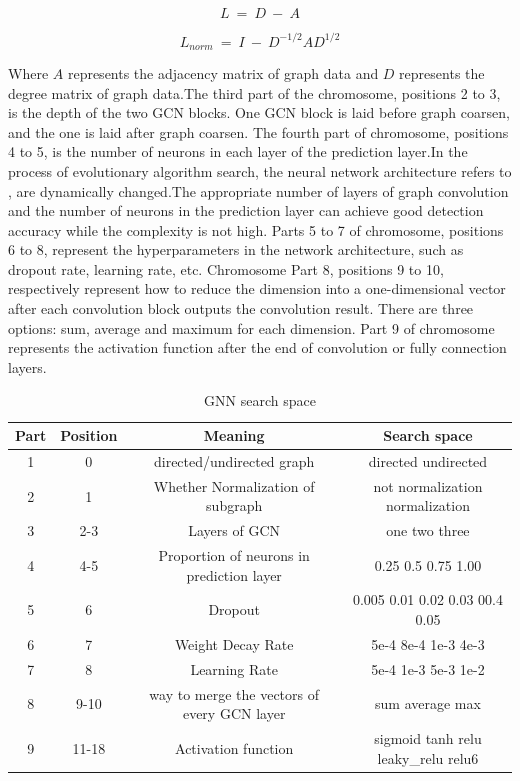 \documentclass[lettersize,journal]{IEEEtran}
\begin{document}
\begin{equation}
\label{deqn_ex_7}
L\ =\ D\ -\ A
\end{equation}

\begin{equation}
\label{deqn_ex_8}
L_{norm}\ =\ I\ -\ D^{-1/2}AD^{1/2}
\end{equation}

Where $A$ represents the adjacency matrix of graph data and $D$ represents the degree matrix of graph data.The third part of the chromosome, positions 2 to 3, is the depth of the two GCN blocks. One GCN block is laid before graph coarsen, and the one is laid after graph coarsen. The fourth part of chromosome, positions 4 to 5, is the number of neurons in each layer of the prediction layer.In the process of evolutionary algorithm search, the neural network architecture refers to \cite{62,67}, are dynamically changed.The appropriate number of layers of graph convolution and the number of neurons in the prediction layer can achieve good detection accuracy while the complexity is not high. Parts 5 to 7 of chromosome, positions 6 to 8, represent the hyperparameters in the network architecture, such as dropout rate, learning rate, etc. Chromosome Part 8, positions 9 to 10, respectively represent how to reduce the dimension into a one-dimensional vector after each convolution block outputs the convolution result. There are three options: sum, average and maximum for each dimension. Part 9 of chromosome represents the activation function after the end of convolution or fully connection layers. 

\begin{table}[!t]
\caption{GNN search space\label{table1}}
\centering
\begin{tabular}{cccc}
\hline
Part & Position & Meaning	 & Search space\\
\hline
1 & 0 & directed/undirected graph & directed undirected\\
2 & 1 & Whether Normalization of subgraph & not normalization normalization\\
3 & 2-3 & Layers of GCN & one two three\\
4 & 4-5 & Proportion of neurons in prediction layer & 0.25 0.5 0.75 1.00\\
5 & 6	 & Dropout & 0.005 0.01 0.02 0.03 00.4 0.05\\
6 & 7 & Weight Decay Rate & 5e-4 8e-4 1e-3 4e-3\\
7 & 8	 & Learning Rate & 5e-4 1e-3 5e-3 1e-2\\
8 & 9-10 & way to merge the vectors of every GCN layer & sum average max\\
9 & 11-18 & Activation function & sigmoid tanh relu  leaky\_relu relu6\\
\hline
\end{tabular}
\end{table}
\end{document}
